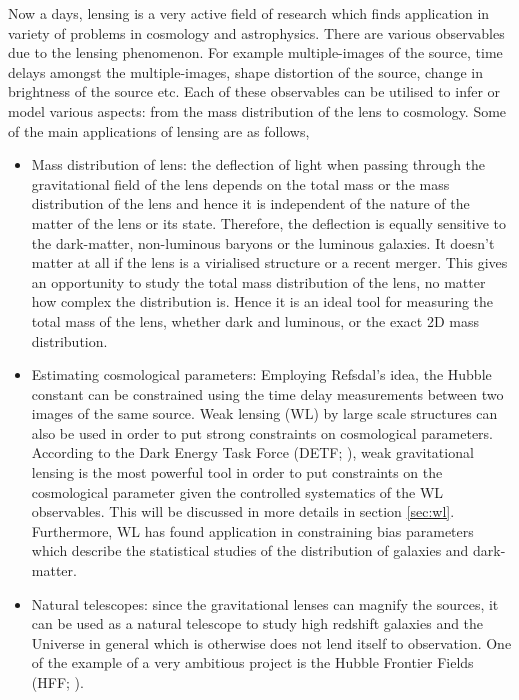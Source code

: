 \documentclass[
  11pt,
  twoside,
  openright,
  titlepage,
  headings=optiontoheadandtoc
]{scrbook}
\begin{document}
Now a days, lensing is a very active field of research which finds application
in variety of problems in cosmology and astrophysics. 
There are various observables due to the lensing phenomenon. For example 
multiple-images of the source, time 
delays amongst the multiple-images, shape distortion of the source, change in brightness
of the source etc. Each of these observables can be utilised to infer or model various
aspects: from the mass distribution of the lens to cosmology. 
Some of the main applications of lensing are as follows,
\begin{itemize}
	\item Mass distribution of lens: the deflection of light when passing through
			the gravitational field of the lens depends on the total mass or the
			mass distribution of the lens and hence it is independent of the nature
			of the matter of the lens or its state. Therefore, the
			deflection is equally sensitive to the dark-matter, non-luminous baryons
			or the luminous galaxies. It doesn't matter at all if the lens is a 
			virialised structure or a recent merger. This gives an opportunity to 
			study the total mass distribution of the lens, no matter how complex 
			the distribution is. Hence it is an ideal tool for measuring the total mass
			of the lens, whether dark and luminous, or the exact 2D mass distribution. 

	\item Estimating cosmological parameters: Employing Refsdal's idea, the Hubble constant
			can be constrained using the time delay measurements between two images
			of the same source. Weak lensing (WL) by large scale structures 
			can also be used in order to put
			strong constraints on cosmological parameters. According to the Dark 
			Energy Task Force (DETF; \cite{2006astro.ph..9591A}), 
			weak gravitational lensing is the most powerful
			tool in order to put constraints on the cosmological parameter given
			the controlled systematics of the WL observables. This will be discussed
			in more details in section \ref{sec:wl}. Furthermore, WL has found application
			in constraining bias parameters which describe the statistical studies
			of the distribution of galaxies and dark-matter. 

	\item Natural telescopes: since the gravitational lenses can magnify the sources, it 
			can be used as a natural telescope to study high redshift galaxies and the Universe
			in general which is otherwise does not lend itself to observation. One of the example of a 
			very ambitious project is the Hubble Frontier Fields 
			(HFF; \cite{2014AAS...22325401L}). 
\end{itemize}
\end{document}
